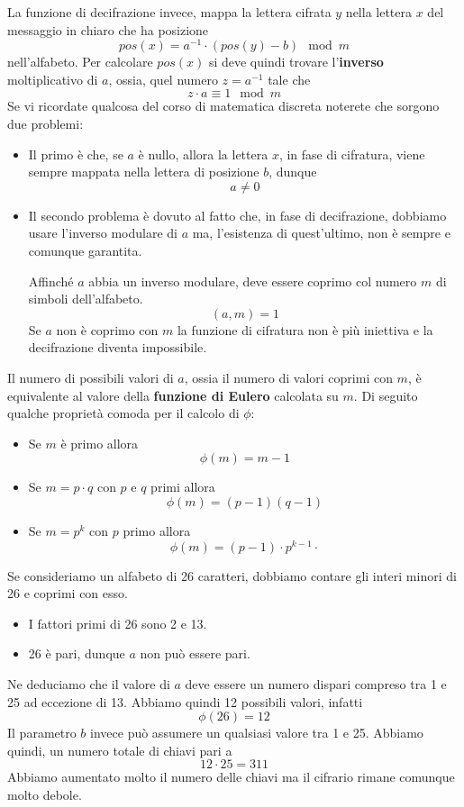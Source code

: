La funzione di decifrazione invece, mappa la lettera cifrata $y$ nella lettera $x$ del messaggio in chiaro che ha
posizione
\[ pos(x) = a^{-1} \cdot (pos(y) - b) \mod{m} \]
nell'alfabeto. Per calcolare $pos(x)$ si deve quindi trovare l'\textbf{inverso} moltiplicativo di $a$, ossia, quel
numero $z = a^{-1}$ tale che
\[ z \cdot a \equiv 1 \mod{m} \]
Se vi ricordate qualcosa del corso di matematica discreta noterete che sorgono due problemi:
\begin{itemize}
	\item Il primo \`e che, se $a$ \`e nullo, allora la lettera $x$, in fase di cifratura, viene sempre mappata nella
	      lettera di posizione $b$, dunque
	      \[ a \neq 0 \]
	\item Il secondo problema \`e dovuto al fatto che, in fase di decifrazione, dobbiamo usare l'inverso modulare di $a$
	      ma, l'esistenza di quest'ultimo, non \`e sempre e comunque garantita.

	      Affinch\'e $a$ abbia un inverso modulare, deve essere coprimo col numero $m$ di simboli dell'alfabeto.
	      \[ (a, m) = 1 \]
	      Se $a$ non \`e coprimo con $m$ la funzione di cifratura non \`e pi\`u iniettiva e la decifrazione
	      diventa impossibile.
\end{itemize}
Il numero di possibili valori di $a$, ossia il numero di valori coprimi con $m$, \`e equivalente al valore della
\textbf{funzione di Eulero} calcolata su $m$. Di seguito qualche propriet\`a comoda per il calcolo di $\phi$:
\begin{itemize}
	\item Se $m$ \`e primo allora
	      \[ \phi(m) = m - 1 \]
	\item Se $m = p \cdot q$ con $p$ e $q$ primi allora
	      \[ \phi(m) = (p - 1)(q - 1) \]
	\item Se $m = p^{k}$ con $p$ primo allora
	      \[ \phi(m) = (p - 1) \cdot p^{k-1} \cdot  \]
\end{itemize}

Se consideriamo un alfabeto di 26 caratteri, dobbiamo contare gli interi minori di 26 e coprimi con esso.
\begin{itemize}
	\item I fattori primi di 26 sono 2 e 13.
	\item 26 \`e pari, dunque $a$ non pu\`o essere pari.
\end{itemize}
Ne deduciamo che il valore di $a$ deve essere un numero dispari compreso tra 1 e 25 ad eccezione di 13. Abbiamo quindi
12 possibili valori, infatti
\[ \phi(26) = 12 \]
Il parametro $b$ invece pu\`o assumere un qualsiasi valore tra 1 e 25. Abbiamo quindi, un numero totale di chiavi pari a
\[ 12 \cdot 25 = 311 \]
Abbiamo aumentato molto il numero delle chiavi ma il cifrario rimane comunque molto debole.

